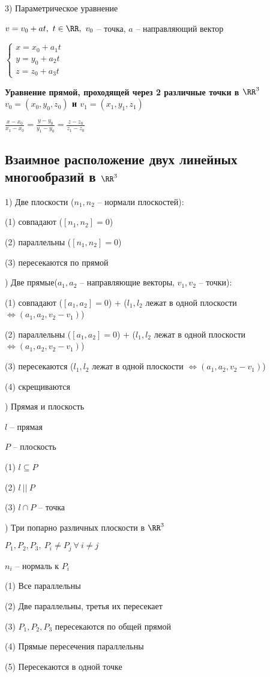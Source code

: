3) Параметрическое уравнение

$v = v_0 + at, \ t \in \RR, \ v_0$ -- точка, $a$ -- направляющий вектор

$\begin{cases} x = x_0 + a_1 t \\ y = y_0 + a_2 t \\ z = z_0 + a_3 t \end{cases}$

\bigskip
\textbf{Уравнение прямой, проходящей через 2 различные точки в $\RR^3$ $v_0 = (x_0, y_0, z_0)$ и $v_1 = (x_1, y_1, z_1)$}

$\frac{x - x_0}{x_1 - x_0} = \frac{y - y_0}{y_1 - y_0} = \frac{z - z_0}{z_1 - z_0}$

\subsection{Взаимное расположение двух линейных многообразий в $\RR^3$}

1) Две плоскости ($n_1, n_2$ -- нормали плоскостей):

(1) совпадают ($[n_1, n_2] = 0$)

(2) параллельны ($[n_1, n_2] = 0$)

(3) пересекаются по прямой

) Две прямые($a_1, a_2$ -- направляющие векторы, $v_1, v_2$ -- точки):

(1) совпадают ($[a_1, a_2] = 0$) + ($l_1, l_2$ лежат в одной плоскости $\Leftrightarrow (a_1, a_2, v_2 - v_1)$)

(2) параллельны ($[a_1, a_2] = 0$) + ($l_1, l_2$ лежат в одной плоскости $\Leftrightarrow (a_1, a_2, v_2 - v_1)$)

(3) пересекаются ($l_1, l_2$ лежат в одной плоскости $\Leftrightarrow (a_1, a_2, v_2 - v_1)$)

(4) скрещиваются

) Прямая и плоскость

$l$ -- прямая

$P$ -- плоскость

(1) $l \subseteq P$

(2) $l \ || \ P$

(3) $l \cap P$ -- точка

) Три попарно различных плоскости в $\RR^3$

$P_1, P_2, P_3, \ P_i \neq P_j \ \forall \ i \neq j$

$n_i$ -- нормаль к $P_i$

(1) Все параллельны

(2) Две параллельны, третья их пересекает

(3) $P_1, P_2, P_3$ пересекаются по общей прямой

(4) Прямые пересечения параллельны

(5) Пересекаются в одной точке


